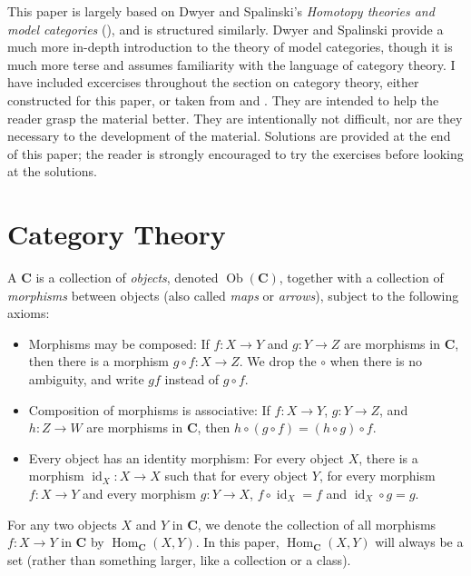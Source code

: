 \documentclass{amsart}
\theoremstyle{definition} \newaliasedtheorem{defn}[thm]{Definition}
\theoremstyle{definition} \newtheorem*{defn*}{Definition}
\theoremstyle{definition} \newaliasedtheorem{xca}[thm]{Exercise}
\theoremstyle{definition} \newtheorem*{soln*}{Solution}
\theoremstyle{definition} \newaliasedtheorem{remark}[thm]{Remark}
\theoremstyle{definition} \newtheorem*{remark*}{Remark}
\newcommand{\defnlabel}[2][]{%
  \ifempty{#1}{%
    \label{defn:#2}\emph{#2}%
  }{%
    \label{defn:#1}\emph{#2}%
  }%
}
\newcommand{\cat}[1]{\ensuremath{\mathbf{#1}}}
\DeclareMathOperator{\Ob}{Ob}
\DeclareMathOperator{\id}{id}
\DeclareMathOperator{\Hom}{Hom}
\begin{document}
  This paper is largely based on Dwyer and Spalinski's \emph{Homotopy theories and model categories} (\cite{dwyer1995homotopy}), and is structured similarly.  Dwyer and Spalinski provide a much more in-depth introduction to the theory of model categories, though it is much more terse and assumes familiarity with the language of category theory.  I have included excercises throughout the section on category theory, either constructed for this paper, or taken from \cite{commutative_algebra} and \cite{sets_maps_limits_colimits}.  They are intended to help the reader grasp the material better.  They are intentionally not difficult, nor are they necessary to the development of the material.  Solutions are provided at the end of this paper; the reader is strongly encouraged to try the exercises before looking at the solutions.

\section{Category Theory}
  \begin{defn}[Category]
    A \defnlabel{category} $\cat C$ is a collection of \emph{objects}, denoted $\Ob(\cat C)$, together with a collection of \emph{morphisms} between objects (also called \emph{maps} or \emph{arrows}), subject to the following axioms:
    \begin{itemize}
      \item Morphisms may be composed:  If $f: X \to Y$ and $g : Y \to Z$ are morphisms in \cat C, then there is a morphism $g \circ f : X \to Z$.  We drop the $\circ$ when there is no ambiguity, and write $gf$ instead of $g \circ f$.
      \item Composition of morphisms is associative:  If $f: X \to Y$, $g: Y\to Z$, and $h: Z\to W$ are morphisms in \cat C, then $h \circ (g \circ f) = (h \circ g) \circ f$.
      \item Every object has an identity morphism:  For every object $X$, there is a morphism $\id_X : X \to X$ such that for every object $Y$, for every morphism $f : X \to Y$ and every morphism $g : Y \to X$, $f \circ \id_X = f$ and $\id_X \circ g = g$.
    \end{itemize}
    
    For any two objects $X$ and $Y$ in $\cat C$, we denote the collection of all morphisms $f: X \to Y$ in $\cat C$ by $\Hom_{\cat C}(X, Y)$.  In this paper, $\Hom_{\cat C}(X, Y)$ will always be a set (rather than something larger, like a collection or a class).
  \end{defn}
  
\end{document}
